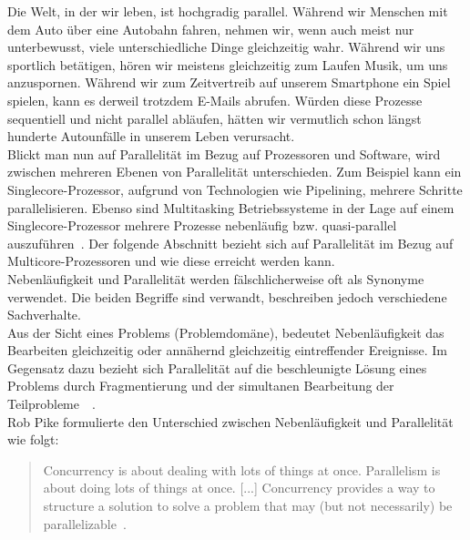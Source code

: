 Die Welt, in der wir leben, ist hochgradig parallel. Während wir Menschen mit dem Auto über eine Autobahn fahren, nehmen wir, wenn auch meist nur unterbewusst, viele unterschiedliche Dinge gleichzeitig wahr. Während wir uns sportlich betätigen, hören wir meistens gleichzeitig zum Laufen Musik, um uns anzuspornen. Während wir zum Zeitvertreib auf unserem Smartphone ein Spiel spielen, kann es derweil trotzdem E-Mails abrufen. Würden diese Prozesse sequentiell und nicht parallel abläufen, hätten wir vermutlich schon längst hunderte Autounfälle in unserem Leben verursacht.\\
Blickt man nun auf Parallelität im Bezug auf Prozessoren und Software, wird zwischen mehreren Ebenen von Parallelität unterschieden. Zum Beispiel kann ein Singlecore-Prozessor, aufgrund von Technologien wie Pipelining, mehrere Schritte parallelisieren. Ebenso sind Multitasking Betriebssysteme in der Lage auf einem Singlecore-Prozessor mehrere Prozesse nebenläufig bzw. quasi-parallel auszuführen~\cite[S.~3~\&~S.~4]{butcher_seven_2014}. Der folgende Abschnitt bezieht sich auf Parallelität im Bezug auf Multicore-Prozessoren und wie diese erreicht werden kann.\\
Nebenläufigkeit und Parallelität werden fälschlicherweise oft als Synonyme verwendet. Die beiden Begriffe sind verwandt, beschreiben jedoch verschiedene Sachverhalte.\\
Aus der Sicht eines Problems (Problemdomäne), bedeutet Nebenläufigkeit das Bearbeiten gleichzeitig oder annähernd gleichzeitig eintreffender Ereignisse. Im Gegensatz dazu bezieht sich Parallelität auf die beschleunigte Lösung eines Problems durch Fragmentierung und der simultanen Bearbeitung der Teilprobleme~\cite[S.~1~\&~S.~2]{butcher_seven_2014}~\cite[S.~15]{vernon_reactive_2016}.\\
Rob Pike formulierte den Unterschied zwischen Nebenläufigkeit und Parallelität wie folgt:

\begin{quotation}
  Concurrency is about dealing with lots of things at once. Parallelism is about doing lots of things at once. [...] Concurrency provides a way to structure a solution to solve a problem that may (but not necessarily) be parallelizable~.
\cite[S.~10]{pike_concurrency_2012}
\end{quotation}

